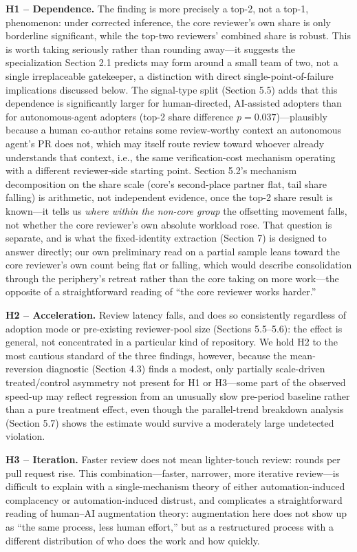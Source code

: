 \documentclass[12pt]{article}
\begin{document}
\textbf{H1 -- Dependence.} The finding is more precisely a top-2, not a
top-1, phenomenon: under corrected inference, the core reviewer's own
share is only borderline significant, while the top-two reviewers'
combined share is robust. This is worth taking seriously rather than
rounding away---it suggests the specialization Section 2.1 predicts may
form around a small team of two, not a single irreplaceable gatekeeper, a
distinction with direct single-point-of-failure implications discussed
below. The signal-type split (Section 5.5) adds that this dependence
is significantly larger for human-directed, AI-assisted adopters than for
autonomous-agent adopters (top-2 share difference $p=0.037$)---plausibly
because a human co-author retains some review-worthy context an
autonomous agent's PR does not, which may itself route review toward
whoever already understands that context, i.e., the same verification-cost
mechanism operating with a different reviewer-side starting point.
Section 5.2's mechanism decomposition on the share scale (core's
second-place partner flat, tail share falling) is arithmetic, not
independent evidence, once the top-2 share result is known---it tells us
\emph{where within the non-core group} the offsetting movement falls,
not whether the core reviewer's own absolute workload rose. That
question is separate, and is what the fixed-identity extraction
(Section 7) is designed to answer directly; our own preliminary read on
a partial sample leans toward the core reviewer's own count being flat
or falling, which would describe consolidation through the periphery's
retreat rather than the core taking on more work---the opposite of a
straightforward reading of ``the core reviewer works harder.''

\textbf{H2 -- Acceleration.} Review latency falls, and does so consistently
regardless of adoption mode or pre-existing reviewer-pool size (Sections
5.5--5.6): the effect is general, not concentrated in a particular kind of
repository. We hold H2 to the most cautious standard of the three
findings, however, because the mean-reversion diagnostic (Section 4.3)
finds a modest, only partially scale-driven treated/control asymmetry not
present for H1 or H3---some part of the observed speed-up may reflect
regression from an unusually slow pre-period baseline rather than a pure
treatment effect, even though the parallel-trend breakdown analysis
(Section 5.7) shows the estimate would survive a moderately large
undetected violation.

\textbf{H3 -- Iteration.} Faster review does not mean lighter-touch review:
rounds per pull request rise. This combination---faster, narrower, more
iterative review---is difficult to explain with a single-mechanism theory
of either automation-induced complacency or automation-induced distrust,
and complicates a straightforward reading of human--AI augmentation
theory: augmentation here does not show up as ``the same process, less
human effort,'' but as a restructured process with a different
distribution of who does the work and how quickly.
\end{document}
